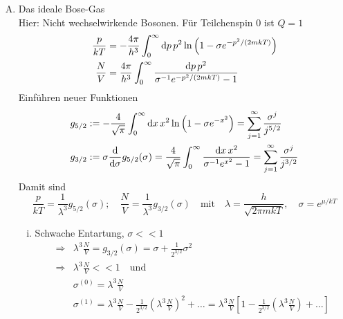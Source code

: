 \begin{enumerate}[A)]
    \item Das ideale Bose-Gas\\
    Hier: Nicht wechselwirkende Bosonen. Für Teilchenspin 0 ist $Q=1$
    \begin{equation}
        \begin{split}
            \frac{p}{k T} &= - \frac{4 \pi}{h^3} \int_0^\infty \mathrm{d} p \, p^2 \ln \left( 1 - \sigma e^{-p^2 / (2 m k T)} \right)  \\
            \frac{N}{V} &= \frac{4 \pi}{h^3} \int_0^\infty \frac{\mathrm{d} p \, p^2}{\sigma^{-1} e^{-p^2 / (2 m k T)} - 1}
        \end{split}
    \end{equation}
    Einführen neuer Funktionen
    \begin{equation}
        \begin{split}
            g_{5/2} &:= - \frac{4}{\sqrt{\pi}} \int_0^\infty \mathrm{d} x \, x^2 \ln \left( 1 - \sigma e^{-x^2} \right) = \sum_{j=1}^\infty  \frac{\sigma^j}{j^{5/2}} \\
            g_{3/2} &:= \sigma \frac{\mathrm{d}}{\mathrm{d} \sigma} g_{5/2}(\sigma) = \frac{4}{\sqrt{\pi}} \int_0^\infty \frac{\mathrm{d} x \, x^2}{\sigma^{-1} e^{x^2} - 1} = \sum_{j=1}^\infty \frac{\sigma^j}{j^{3/2}}
        \end{split}
    \end{equation}
    Damit sind
    \begin{equation}
        \frac{p}{k T} = \frac{1}{\lambda^3} g_{5/2}(\sigma); \quad \frac{N}{V} = \frac{1}{\lambda^3} g_{3/2}(\sigma) \quad \text{mit} \quad \lambda = \frac{h}{\sqrt{2 \pi m k T}}, \quad \sigma = e^{\mu / k T}
    \end{equation}
    \begin{enumerate}[i)]
        \item Schwache Entartung, $\sigma << 1$
        \begin{equation}
            \begin{split}
                \Rightarrow & \lambda^3 \frac{N}{V} = g_{3/2}(\sigma) = \sigma + \frac{1}{2^{3/2}} \sigma^2 \\
                \Rightarrow & \lambda^3 \frac{N}{V} << 1 \quad \text{und} \\
                & \sigma^{(0)} = \lambda^3 \frac{N}{V} \\
                & \sigma^{(1)} = \lambda^3 \frac{N}{V} - \frac{1}{2^{3/2}} \left( \lambda^3 \frac{N}{V} \right)^2 + \ldots = \lambda^3 \frac{N}{V} \left[ 1 - \frac{1}{2^{3/2}} \left( \lambda^3 \frac{N}{V}\right) + \ldots \right] \\

\end{split}
\end{equation}
\end{enumerate}
\end{enumerate}
